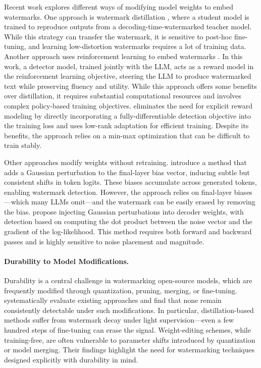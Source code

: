 Recent work explores different ways of modifying model weights to embed watermarks. One approach is watermark distillation \citep{gu2023learnability}, where a student model is trained to reproduce outputs from a decoding-time-watermarked teacher model. While this strategy can transfer the watermark, it is sensitive to post-hoc fine-tuning, and learning low-distortion watermarks requires a lot of training data. Another approach uses reinforcement learning to embed watermarks \citep{xu2024learningwatermarkllmgeneratedtext}. In this work, a detector model, trained jointly with the LLM, acts as a reward model in the reinforcement learning objective, steering the LLM to produce watermarked text while preserving fluency and utility. While this approach offers some benefits over distillation, it requires substantial computational resources and involves complex policy-based training objectives. \citet{elhassan2025can} eliminates the need for explicit reward modeling by directly incorporating a fully-differentiable detection objective into the training loss and uses low-rank adaptation \citet{hu2022lora} for efficient training. Despite its benefits, the approach relies on a min-max optimization that can be difficult to train stably.

Other approaches modify weights without retraining. \citet{christ2024provably} introduce a method that adds a Gaussian perturbation to the final-layer bias vector, inducing subtle but consistent shifts in token logits. These biases accumulate across generated tokens, enabling watermark detection. However, the approach relies on final-layer biases—which many LLMs omit—and the watermark can be easily erased by removing the bias. \citet{block2025gaussmark} propose injecting Gaussian perturbations into decoder weights, with detection based on computing the dot product between the noise vector and the gradient of the log-likelihood. This method requires both forward and backward passes and is highly sensitive to noise placement and magnitude.

\paragraph{Durability to Model Modifications.}
Durability is a central challenge in watermarking open-source models, which are frequently modified through quantization, pruning, merging, or fine-tuning. \citet{gloaguen2025towards} systematically evaluate existing approaches and find that none remain consistently detectable under such modifications.  In particular, distillation-based methods suffer from watermark decay under light supervision—even a few hundred steps of fine-tuning can erase the signal. Weight-editing schemes, while training-free, are often vulnerable to parameter shifts introduced by quantization or model merging. Their findings highlight the need for watermarking techniques designed explicitly with durability in mind.

